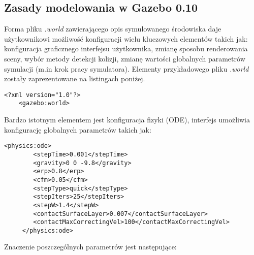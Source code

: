 	\subsection{Zasady modelowania w Gazebo 0.10}
	Forma pliku \textit{.world} zawierającego opis symulowanego środowiska daje użytkownikowi możliwość konfiguracji wielu kluczowych elementów takich jak: konfiguracja graficznego interfejsu użytkownika,
	zmianę sposobu renderowania sceny, wybór metody detekcji kolizji, zmianę wartości globalnych parametrów symulacji (m.in krok pracy symulatora). Elementy przykładowego pliku \textit{.world} zostały zaprezentowane na listingach poniżej.
	\begin{lstlisting}[name=gazebo_simple_world]
	<?xml version="1.0"?>
	<gazebo:world>
	\end{lstlisting}
	Bardzo istotnym elementem jest konfiguracja fizyki (ODE), interfejs umożliwia konfigurację globalnych parametrów takich jak:
	\begin{lstlisting}[name=gazebo_simple_world]
	<physics:ode>
		<stepTime>0.001</stepTime>
		<gravity>0 0 -9.8</gravity>		
		<erp>0.8</erp>
		<cfm>0.05</cfm>
		<stepType>quick</stepType>
		<stepIters>25</stepIters>
		<stepW>1.4</stepW>
		<contactSurfaceLayer>0.007</contactSurfaceLayer>
		<contactMaxCorrectingVel>100</contactMaxCorrectingVel>
	 </physics:ode>
	\end{lstlisting}
	Znaczenie poszczególnych parametrów jest następujące:
